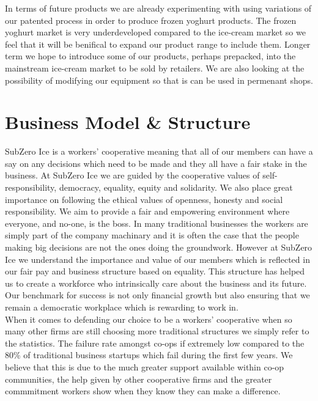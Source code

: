 \documentclass{article}
\begin{document}
  In terms of future products we are already experimenting with using variations of our patented process in order to produce frozen yoghurt products. The frozen yoghurt market is very underdeveloped compared to the ice-cream market so we feel that it will be benifical to expand our product range to include them. Longer term we hope to introduce some of our products, perhaps prepacked, into the mainstream ice-cream market to be sold by retailers. We are also looking at the possibility of modifying our equipment so that is can be used in permenant shops. \\


\section{Business Model \& Structure}

  SubZero Ice is a workers' cooperative meaning that all of our members can have a say on any decisions which need to be made and they all have a fair stake in the business. At SubZero Ice we are guided by the cooperative values of self-responsibility, democracy, equality, equity and solidarity. We also place great importance on following the ethical values of openness, honesty and social responsibility. We aim to provide a fair and empowering environment where everyone, and no-one, is the boss. In many traditional businesses the workers are simply part of the company machinary and it is often the case that the people making big decisions are not the ones doing the groundwork. However at SubZero Ice we understand the importance and value of our members which is reflected in our fair pay and business structure based on equality. This structure has helped us to create a workforce who intrinsically care about the business and its future. Our benchmark for success is not only financial growth but also ensuring that we remain a democratic workplace which is rewarding to work in. \\

  When it comes to defending our choice to be a workers' cooperative when so many other firms are still choosing more traditional structures we simply refer to the statistics. The failure rate amongst co-ops if extremely low compared to the 80\% of traditional business startups which fail during the first few years. We believe that this is due to the much greater support available within co-op communities, the help given by other cooperative firms and the greater commmitment workers show when they know they can make a difference. \\
\end{document}
